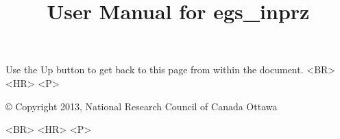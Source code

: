 \documentclass[12pt,twoside]{article}   %
\begin{document}

\setlength{\baselineskip}{0.5cm}


\begin{htmlonly}



\begin{rawhtml}
Use the Up button to get back to this page from within the document.
<BR> <HR> <P>
\end{rawhtml}

\copyright
Copyright 2013, National Research Council of Canada
Ottawa

\begin{rawhtml}
<BR> <HR> <P>
\end{rawhtml}

\end{htmlonly}

\pagestyle{empty}

\title{User Manual for egs\_inprz}
\end{document}
